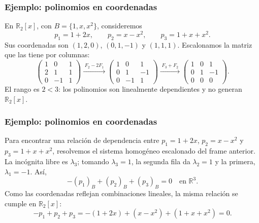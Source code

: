 \begin{frame}
    \frametitle{Ejemplo: polinomios en coordenadas}

    \begin{example}
        En \(\mathbb{R}_2[x]\), con \(B=\{1,x,x^2\}\), consideremos
        \[
            p_1=1+2x,\qquad
            p_2=x-x^2,\qquad
            p_3=1+x+x^2.
        \]
        Sus coordenadas son \((1,2,0) \), \((0,1,-1) \) y \((1,1,1) \).
        Escalonamos la matriz que las tiene por columnas:
        \[
            \begin{pmatrix}
                1&0&1\\
                2&1&1\\
                0&-1&1
            \end{pmatrix}
            \xrightarrow{\;F_2-2F_1\;}
            \begin{pmatrix}
                1&0&1\\
                0&1&-1\\
                0&-1&1
            \end{pmatrix}
            \xrightarrow{\;F_3+F_2\;}
            \begin{pmatrix}
                1&0&1\\
                0&1&-1\\
                0&0&0
            \end{pmatrix}.
        \]
        El rango es \(2<3\): los polinomios son linealmente
        \alert{dependientes} y \alert{no generan} \(\mathbb{R}_2[x]\).
    \end{example}
\end{frame}


\begin{frame}
    \frametitle{Ejemplo: polinomios en coordenadas}

    \begin{example}
        Para encontrar una relación de dependencia entre
        \(p_1=1+2x\), \(p_2=x-x^2\) y \(p_3=1+x+x^2\), resolvemos el
        sistema homogéneo escalonado del frame anterior. La incógnita libre es \(\lambda_3\);
        tomando \(\lambda_3=1\), la segunda fila da \(\lambda_2=1\) y la
        primera, \(\lambda_1=-1\). Así,
        \[
            -(p_1)_B+(p_2)_B+(p_3)_B=0
            \quad\text{en }\mathbb{R}^3.
        \]
        Como las coordenadas reflejan combinaciones lineales, la misma
        relación se cumple en \(\mathbb{R}_2[x]\):
        \[
            -p_1+p_2+p_3=-(1+2x)+(x-x^2)+(1+x+x^2)=0.
        \]
    \end{example}
\end{frame}


